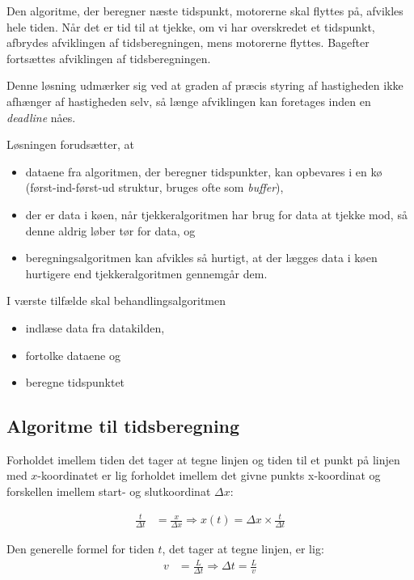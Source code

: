 Den algoritme, der beregner næste tidspunkt, motorerne skal flyttes
på, afvikles hele tiden. Når det er tid til at tjekke, om vi har
overskredet et tidspunkt, afbrydes afviklingen af tidsberegningen,
mens motorerne flyttes. Bagefter fortsættes afviklingen af
tidsberegningen.

Denne løsning udmærker sig ved at graden af præcis styring af
hastigheden ikke afhænger af hastigheden selv, så længe afviklingen
kan foretages inden en \textit{deadline} nåes.

Løsningen forudsætter, at
\begin{itemize} \firmlist
\item dataene fra algoritmen, der beregner tidspunkter, kan opbevares
  i en kø (først-ind-først-ud struktur, bruges ofte som
  \textit{buffer}),
\item der er data i køen, når tjekkeralgoritmen har brug for data at
  tjekke mod, så denne aldrig løber tør for data, og
\item beregningsalgoritmen kan afvikles så hurtigt, at der lægges data
  i køen hurtigere end tjekkeralgoritmen gennemgår dem.
\end{itemize}

I værste tilfælde skal behandlingsalgoritmen
\begin{itemize} \firmlist
\item indlæse data fra datakilden,
\item fortolke dataene og
\item beregne tidspunktet
\end{itemize}


\subsection{Algoritme til tidsberegning}

Forholdet imellem tiden det tager at tegne linjen og tiden til et
punkt på linjen med $x$-koordinatet er lig forholdet imellem det givne
punkts x-koordinat og forskellen imellem start- og slutkoordinat $\Delta x$:

\begin{align}
\frac{t}{\Delta t} &= \frac{x}{\Delta x} \Rightarrow x(t) = \Delta x \times \frac{t}{\Delta t}
\end{align}

Den generelle formel for tiden $t$, det tager at tegne linjen, er lig:
\begin{align}
v &= \frac{L}{\Delta t} \Rightarrow \Delta t= \frac{L}{v}
\end{align}

